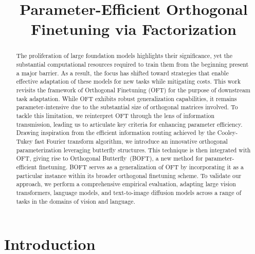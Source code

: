 \title{Parameter-Efficient Orthogonal Finetuning via Factorization}

\begin{abstract}
The proliferation of large foundation models highlights their significance, yet the substantial computational resources required to train them from the beginning present a major barrier. As a result, the focus has shifted toward strategies that enable effective adaptation of these models for new tasks while mitigating costs. This work revisits the framework of Orthogonal Finetuning (OFT) for the purpose of downstream task adaptation. While OFT exhibits robust generalization capabilities, it remains parameter-intensive due to the substantial size of orthogonal matrices involved. To tackle this limitation, we reinterpret OFT through the lens of information transmission, leading us to articulate key criteria for enhancing parameter efficiency. Drawing inspiration from the efficient information routing achieved by the Cooley-Tukey fast Fourier transform algorithm, we introduce an innovative orthogonal parameterization leveraging butterfly structures. This technique is then integrated with OFT, giving rise to Orthogonal Butterfly~(BOFT), a new method for parameter-efficient finetuning. BOFT serves as a generalization of OFT by incorporating it as a particular instance within its broader orthogonal finetuning scheme. To validate our approach, we perform a comprehensive empirical evaluation, adapting large vision transformers, language models, and text-to-image diffusion models across a range of tasks in the domains of vision and language.
\end{abstract}

\section{Introduction}

